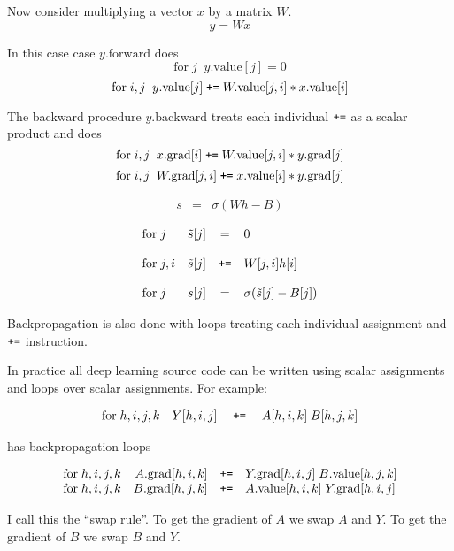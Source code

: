 {
Now consider multiplying a vector $x$ by a matrix $W$.
$$y = Wx$$

\vfill
In this case case $y.\mathrm{forward}$ does
$$\mathrm{for}\;j\;\;y.\mathrm{value}[j] = 0$$
$$\mathrm{for}\;i,j\;\;y.\mathrm{value}[j] \;\mbox{\tt +=}\;W.\mathrm{value}[j,i]*x.\mathrm{value}[i]$$

\vfill
The backward procedure $y.\mathrm{backward}$ treats each individual $\mbox{\tt +=}$ as a scalar product and does
$$\mathrm{for}\;i,j\;\;x.\mathrm{grad}[i] \;\mbox{\tt +=}\;W.\mathrm{value}[j,i]*y.\mathrm{grad}[j]$$
$$\mathrm{for}\;i,j\;\;W.\mathrm{grad}[j,i] \;\mbox{\tt +=}\;x.\mathrm{value}[i]*y.\mathrm{grad}[j]$$


\begin{eqnarray*}
   s & = & \sigma\left(Wh - B \right)
\end{eqnarray*}

$$\begin{array}{lrcl}
\mathrm{for}\;j &  \tilde{s}[j] & = & 0 \\
\\
\mathrm{for}\;j,i &  \tilde{s}[j] & \mbox{\tt +=} &  W[j,i]h[i] \\
\\
\mathrm{for}\; j & s[j] & = & \sigma(\tilde{s}[j] - B[j])
\end{array}$$

\vfill
Backpropagation is also done with loops treating each individual assignment and $\mbox{\tt +=}$ instruction.


In practice all deep learning source code can be written using scalar assignments and loops over scalar assignments.
For example:

$$\begin{array}{rrcl}
\mathrm{for}\; h,i,j,k & Y[h,i,j] & \;\mbox{\tt +=}\; & A[h,i,k]\;B[h,j,k] \\
\end{array}$$

\vfill
has backpropagation loops

$$\begin{array}{rrcl}
\mathrm{for}\;h,i,j,k & A.\mathrm{grad}[h,i,k] & \mbox{\tt +=} & Y.\mathrm{grad}[h,i,j] \;B.\mathrm{value}[h,j,k] \\
\mathrm{for}\;h,i,j,k & B.\mathrm{grad}[h,j,k] & \mbox{\tt +=} & A.\mathrm{value}[h,i,k]\;Y.\mathrm{grad}[h,i,j]
\end{array}$$

\vfill
I call this the ``swap rule''.  To get the gradient of $A$ we swap $A$ and $Y$.  To get the gradient of $B$ we swap $B$ and $Y$.
}


